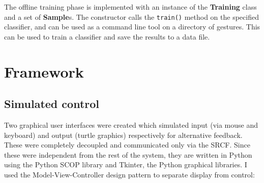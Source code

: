 \documentclass[12pt,a4,notitlepage]{report}
\renewcommand{\_}{\texttt{\symbol{95}}}
\newcommand{\<}{\texttt{\symbol{60}}}
\renewcommand{\>}{\texttt{\symbol{62}}}
\newcommand{\class}[1]{\textbf{#1}}
\newcommand{\variable}[1]{\texttt{#1}}
\begin{document}
The offline training phase is implemented with an instance of the \class{Training} class and a set of \class{Sample}s. The constructor calls the \variable{train()} method on the specified classifier, and can be used as a command line tool on a directory of gestures. This can be used to train a classifier and save the results to a data file.

\section{Framework}

\subsection{Simulated control}

Two graphical user interfaces were created which simulated input (via mouse and keyboard) and output (turtle graphics) respectively for alternative feedback. These were completely decoupled and communicated only via the SRCF. Since these were independent from the rest of the system, they are written in Python using the Python SCOP library and Tkinter, the Python graphical libraries. I used the Model-View-Controller design pattern to separate display from control:
\end{document}
